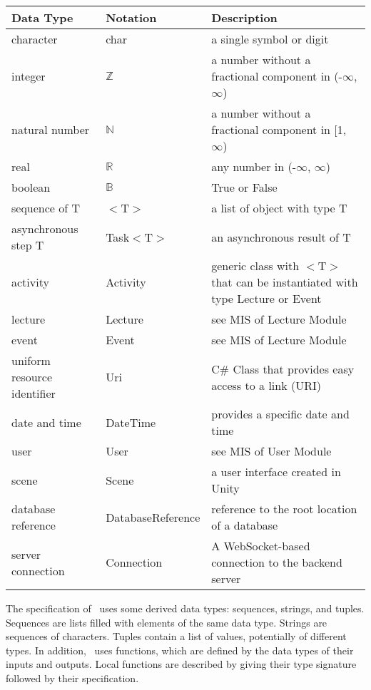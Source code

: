 \documentclass[12pt, titlepage]{article}
\begin{document}
\begin{center}
\renewcommand{\arraystretch}{1.2}
\noindent 
\begin{tabular}{l l p{7.5cm}} 
\toprule 
\textbf{Data Type} & \textbf{Notation} & \textbf{Description}\\ 
\midrule
character & char & a single symbol or digit\\
integer & $\mathbb{Z}$ & a number without a fractional component in (-$\infty$, $\infty$) \\
natural number & $\mathbb{N}$ & a number without a fractional component in [1, $\infty$) \\
real & $\mathbb{R}$ & any number in (-$\infty$, $\infty$)\\
boolean & $\mathbb{B}$ & True or False\\
sequence of T & $<$T$>$ & a list of object with type T\\
asynchronous step T & Task$<$T$>$ & an asynchronous result of T\\
activity & Activity & generic class with $<$T$>$ that can be instantiated with type Lecture or Event\\
lecture & Lecture & see MIS of Lecture Module \\
event & Event & see MIS of Lecture Module \\
uniform resource identifier & Uri & C\# Class that provides easy access to a link (URI) \\
date and time & DateTime & provides a specific date and time \\
user & User & see MIS of User Module \\
scene & Scene & a user interface created in Unity \\
database reference & DatabaseReference & reference to the root location of a database \\
server connection & Connection & A WebSocket-based connection to the backend server \\


\bottomrule
\end{tabular} 
\end{center}

\noindent
The specification of \progname \ uses some derived data types: sequences, strings, and
tuples. Sequences are lists filled with elements of the same data type. Strings
are sequences of characters. Tuples contain a list of values, potentially of
different types. In addition, \progname \ uses functions, which
are defined by the data types of their inputs and outputs. Local functions are
described by giving their type signature followed by their specification.
\end{document}

